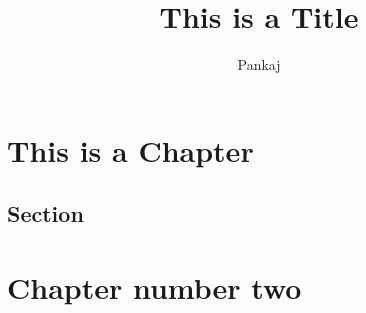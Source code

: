 \documentclass{pkStudyNotes}
\begin{document}
    \title{This is a Title}
    \author{Pankaj}
    \createTitle  
    \chapter{This is a Chapter}
    \section{Section}
   \lipsum[1]
   \chapter{Chapter number two}
   \lipsum[2-5]

    
    
\end{document}
